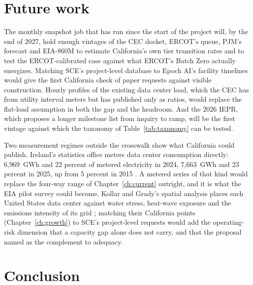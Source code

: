 \section{Future work}
\label{sec:future}

The monthly snapshot job that has run since the start of the project will, by the end of 2027, hold enough vintages of the CEC docket, ERCOT's queue, PJM's forecast and EIA-860M to estimate California's own tier transition rates and to test the ERCOT-calibrated case against what ERCOT's Batch Zero actually energizes. Matching SCE's project-level database to Epoch AI's facility timelines would give the first California check of paper requests against visible construction. Hourly profiles of the existing data center load, which the CEC has from utility interval meters but has published only as ratios, would replace the flat-load assumption in both the gap and the headroom. And the 2026 IEPR, which proposes a longer milestone list from inquiry to ramp, will be the first vintage against which the taxonomy of Table~\ref{tab:taxonomy} can be tested.

Two measurement regimes outside the crosswalk show what California could publish. Ireland's statistics office meters data center consumption directly: 6,969~GWh and 22 percent of metered electricity in 2024, 7,663~GWh and 23 percent in 2025, up from 5 percent in 2015 \citep{cso2025}. A metered series of that kind would replace the four-way range of Chapter~\ref{ch:current} outright, and it is what the EIA pilot survey could become. Kollar and Grady's spatial analysis places each United States data center against water stress, heat-wave exposure and the emissions intensity of its grid \citep{kollar2025}; matching their California points (Chapter~\ref{ch:growth}) to SCE's project-level requests would add the operating-risk dimension that a capacity gap alone does not carry, and that the proposal named as the complement to adequacy.

\section{Conclusion}
\label{sec:conclusion}


